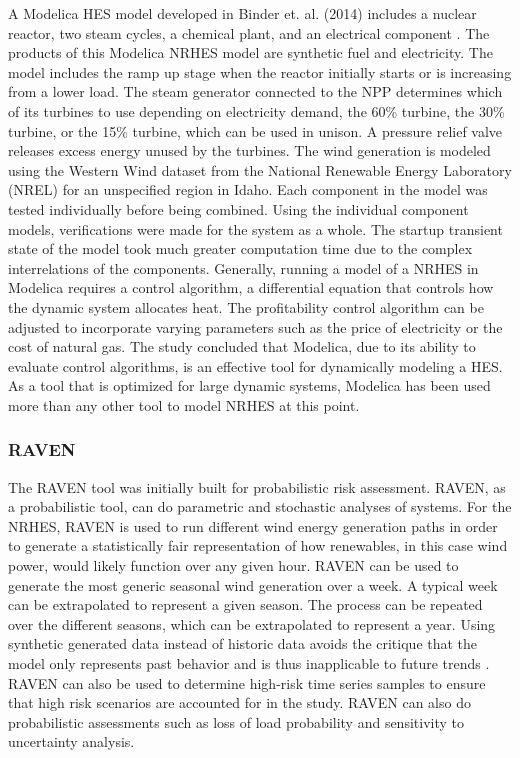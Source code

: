 \documentclass{article}                                                                           %
\begin{document}
\begin{linenumbers}
A Modelica HES model developed in Binder et. al. (2014) includes a nuclear reactor, two steam cycles, a chemical plant, and an electrical component \cite{Binder2014}. The products of this Modelica NRHES model are synthetic fuel and electricity. The model includes the ramp up stage when the reactor initially starts or is increasing from a lower load. The steam generator connected to the NPP determines which of its turbines to use depending on electricity demand, the 60\% turbine, the 30\% turbine, or the 15\% turbine, which can be used in unison. A pressure relief valve releases excess energy unused by the turbines. The wind generation is modeled using the Western Wind dataset from the National Renewable Energy Laboratory (NREL) for an unspecified region in Idaho. Each component in the model was tested individually before being combined. Using the individual component models, verifications were made for the system as a whole. The startup transient state of the model took much greater computation time due to the complex interrelations of the components. Generally, running a model of a NRHES in Modelica requires a control algorithm, a differential equation that controls how the dynamic system allocates heat. The profitability control algorithm can be adjusted to incorporate varying parameters such as the price of electricity or the cost of natural gas. The study concluded that Modelica, due to its ability to evaluate control algorithms, is an effective tool for dynamically modeling a HES. As a tool that is optimized for large dynamic systems, Modelica has been used more than any other tool to model NRHES at this point.

\subsubsection{RAVEN}
The RAVEN tool was initially built for probabilistic risk assessment. RAVEN, as a probabilistic tool, can do parametric and stochastic analyses of systems\cite{RabitiRAVEN}. For the NRHES, RAVEN is used to run different wind energy generation paths in order to generate a statistically fair representation of how renewables, in this case wind power, would likely function over any given hour. RAVEN can be used to generate the most generic seasonal wind generation over a week. A typical week can be extrapolated to represent a given season. The process can be repeated over the different seasons, which can be extrapolated to represent a year. Using synthetic generated data instead of historic data avoids the critique that the model only represents past behavior and is thus inapplicable to future trends \cite{redfoot_epiney_2016}. RAVEN can also be used to determine high-risk time series samples to ensure that high risk scenarios are accounted for in the study. RAVEN can also do probabilistic assessments such as loss of load probability and sensitivity to uncertainty analysis.


\end{linenumbers}
\end{document}
